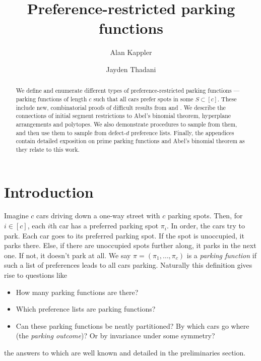 \documentclass[12 pt]{amsart}
\title{Preference-restricted parking functions}
\author[Kappler]{Alan Kappler}
\author[Thadani]{Jayden Thadani}
\theoremstyle{definition} %
\theoremstyle{remark} %
\begin{document}
\begin{abstract}
	We define and enumerate different types of preference-restricted parking functions --- parking functions of length $c$ such that all cars prefer spots in some $S \subset [c]$. These include new, combinatorial proofs of difficult results from \cite{cameron-johannsen-prellberg-schweitzer-2008} and \cite{blake-konheim-1977}. We describe the connections of initial segment restrictions to Abel's binomial theorem, hyperplane arrangements and polytopes. We also demonstrate procedures to sample from them, and then use them to sample from defect-$d$ preference lists. Finally, the appendices contain detailed exposition on prime parking functions and Abel's binomial theorem as they relate to this work.
\end{abstract}

\maketitle
\tableofcontents


\makeatletter
\providecommand\@dotsep{5}
\makeatother
\listoftodos\relax

\section{Introduction}

Imagine $c$ cars driving down a one-way street with $c$ parking spots. Then, for $i \in [c]$, each $i$th car has a preferred parking spot $\pi_{i}$. In order, the cars try to park. Each car goes to its preferred parking spot. If the spot is unoccupied, it parks there. Else, if there are unoccupied spots further along, it parks in the next one. If not, it doesn't park at all. We say $\pi = (\pi_{1}, \dots, \pi_{c})$ is a \emph{parking function} if such a list of preferences leads to all cars parking. Naturally this definition gives rise to questions like
\begin{itemize}
	\item How many parking functions are there?
	\item Which preference lists are parking functions?
	\item Can these parking functions be neatly partitioned? By which cars go where (the \emph{parking outcome})? Or by invariance under some symmetry?
\end{itemize}
the answers to which are well known and detailed in the preliminaries section.
\end{document}
